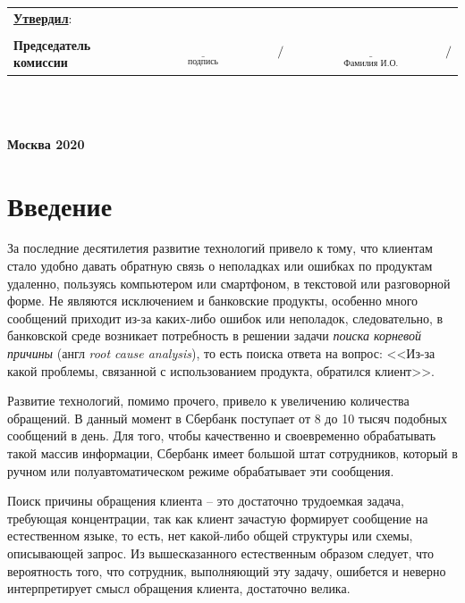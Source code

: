 \documentclass[a4paper,12pt,preview]{report} %
\begin{document}
	\noindent
	\normalsize{ 
		\begin{tabular}{lcc}
			\textbf{\underline{Утвердил}}: \\\\
			\textbf{Председатель комиссии} &
			$\underset{\text{подпись}}{\underline{\hspace{5cm}}}/$
			&
			$\underset{\text{Фамилия И.О.}}{\underline{\hspace{5cm}}}/$
		\end{tabular}
	}\\\\
	
	\vfill
	\begin{center}
	\textbf{Москва 2020}
	\end{center}
	
	
	\thispagestyle{empty}
	\newpage
	
	\tableofcontents %
	
	
	
	\chapter*{Введение}
	
	За последние десятилетия развитие технологий привело к тому, что клиентам стало удобно давать обратную связь о неполадках или ошибках по продуктам удаленно, пользуясь компьютером или смартфоном, в текстовой или разговорной форме. Не являются исключением и банковские продукты, особенно много сообщений приходит из-за каких-либо ошибок или неполадок, следовательно, в банковской среде возникает потребность в решении задачи \textit{поиска корневой причины} (англ \textit{root cause analysis}), то есть поиска ответа на вопрос: <<Из-за какой проблемы, связанной с использованием продукта, обратился клиент>>.
	
	Развитие технологий, помимо прочего, привело к увеличению количества обращений. В данный момент в Сбербанк поступает от 8 до 10 тысяч подобных сообщений в день. Для того, чтобы качественно и своевременно обрабатывать такой массив информации, Сбербанк имеет большой штат сотрудников, который в ручном или полуавтоматическом режиме обрабатывает эти сообщения.
	
	
	Поиск причины обращения клиента -- это достаточно трудоемкая задача, требующая концентрации, так как клиент зачастую формирует сообщение на естественном языке, то есть, нет какой-либо общей структуры или схемы, описывающей запрос. Из вышесказанного естественным образом следует, что вероятность того, что сотрудник, выполняющий эту задачу, ошибется и неверно интерпретирует смысл обращения клиента, достаточно велика. 
	
\end{document}
